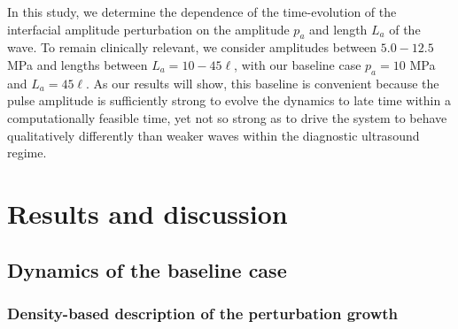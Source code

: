 In this study, we determine the dependence of the time-evolution of
the interfacial amplitude perturbation on the amplitude $p_a$ and
length $L_a$ of the wave. To remain clinically relevant, we consider
amplitudes between $5.0-12.5$ MPa and lengths between $L_a =
10-45\ell$, with our baseline case $p_a=10$ MPa and $L_a=45 \ell$. As
our results will show, this baseline is convenient because the pulse
amplitude is sufficiently strong to evolve the dynamics to late time
within a computationally feasible time, yet not so strong as to drive
the system to behave qualitatively differently than weaker waves
within the diagnostic ultrasound regime.

\section{Results and discussion}%
\label{sec:results}%
 

\subsection{Dynamics of the baseline case}

\label{subsec:Qualitative}
\subsubsection{Density-based description of the perturbation growth}

